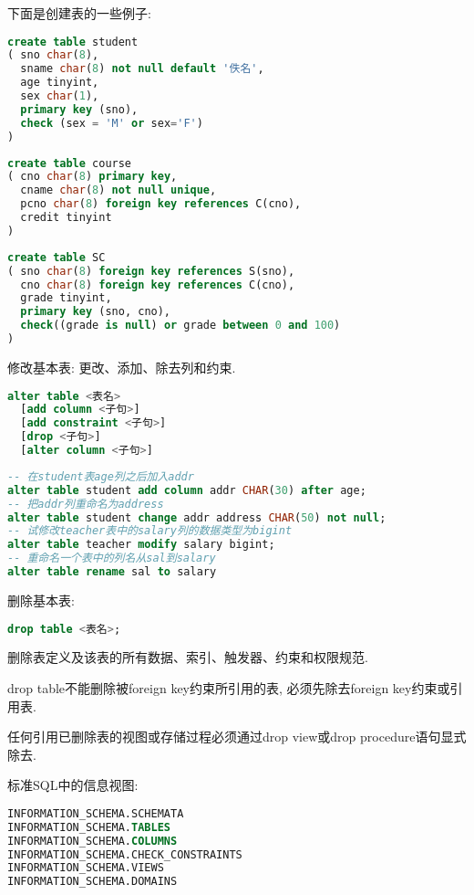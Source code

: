 下面是创建表的一些例子:
\begin{lstlisting}[language=SQL]
create table student
( sno char(8),
  sname char(8) not null default '佚名',
  age tinyint,
  sex char(1),
  primary key (sno),
  check (sex = 'M' or sex='F')
)
\end{lstlisting}

\begin{lstlisting}[language=SQL]
create table course
( cno char(8) primary key,
  cname char(8) not null unique,
  pcno char(8) foreign key references C(cno),
  credit tinyint
)
\end{lstlisting}

\begin{lstlisting}[language=SQL]
create table SC
( sno char(8) foreign key references S(sno),
  cno char(8) foreign key references C(cno),
  grade tinyint,
  primary key (sno, cno),
  check((grade is null) or grade between 0 and 100)
)
\end{lstlisting}

修改基本表: 更改、添加、除去列和约束.
\begin{lstlisting}[language=SQL]
alter table <表名>
  [add column <子句>]
  [add constraint <子句>]
  [drop <子句>]
  [alter column <子句>]
\end{lstlisting}

\begin{lstlisting}[language=SQL]
-- 在student表age列之后加入addr
alter table student add column addr CHAR(30) after age;
-- 把addr列重命名为address
alter table student change addr address CHAR(50) not null;
-- 试修改teacher表中的salary列的数据类型为bigint
alter table teacher modify salary bigint;
-- 重命名一个表中的列名从sal到salary
alter table rename sal to salary
\end{lstlisting}

删除基本表:
\begin{lstlisting}[language=SQL]
drop table <表名>;
\end{lstlisting}
删除表定义及该表的所有数据、索引、触发器、约束和权限规范.

drop table不能删除被foreign key约束所引用的表, 必须先除去foreign key约束或引用表.

任何引用已删除表的视图或存储过程必须通过drop view或drop procedure语句显式除去.

标准SQL中的信息视图:
\begin{lstlisting}[language=SQL]
INFORMATION_SCHEMA.SCHEMATA
INFORMATION_SCHEMA.TABLES
INFORMATION_SCHEMA.COLUMNS
INFORMATION_SCHEMA.CHECK_CONSTRAINTS
INFORMATION_SCHEMA.VIEWS
INFORMATION_SCHEMA.DOMAINS
\end{lstlisting}

